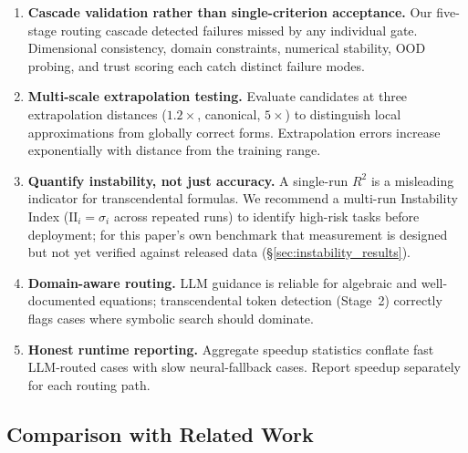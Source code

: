 \documentclass[twoside,11pt]{article}
\newcommand{\Rsq}{R^{2}}
\newcommand{\II}{\mathrm{II}}
\begin{document}
\begin{enumerate}
  \item \textbf{Cascade validation rather than single-criterion acceptance.} Our five-stage routing cascade detected failures missed by any individual gate. Dimensional consistency, domain constraints, numerical stability, OOD probing, and trust scoring each catch distinct failure modes.
  \item \textbf{Multi-scale extrapolation testing.} Evaluate candidates at three extrapolation distances ($1.2\times$, canonical, $5\times$) to distinguish local approximations from globally correct forms. Extrapolation errors increase exponentially with distance from the training range.
  \item \textbf{Quantify instability, not just accuracy.} A single-run $\Rsq$ is a misleading indicator for transcendental formulas. We recommend a multi-run Instability Index ($\II_i = \sigma_i$ across repeated runs) to identify high-risk tasks before deployment; for this paper's own benchmark that measurement is designed but not yet verified against released data (\S\ref{sec:instability_results}).
  \item \textbf{Domain-aware routing.} LLM guidance is reliable for algebraic and well-documented equations; transcendental token detection (Stage~2) correctly flags cases where symbolic search should dominate.
  \item \textbf{Honest runtime reporting.} Aggregate speedup statistics conflate fast LLM-routed cases with slow neural-fallback cases. Report speedup separately for each routing path.
\end{enumerate}

\subsection{Comparison with Related Work}\label{subsec:comparison-with-related-work}
\label{sec:disc_related}
\end{document}
